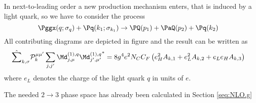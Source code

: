In next-to-leading order a new production mechanism enters, that is induced by a light quark, so we have to consider the process
\begin{equation}
\Pggx(q;\sigma_q) + \Pq(k_1;\sigma_{k_1}) \rightarrow \PQ(p_1)+\PaQ(p_2) + \Pq(k_2)
\end{equation}
All contributing diagrams are depicted in figure  and the result can be written as
\begin{equation}
\hat\sum_{k,\sigma}\mathcal P_{k}^{\mu\mu'}\sum_{j,j'}{\Md^{(1),q}_{j,\mu}\Md^{(1),q}_{j',\mu'}}^* = 8g^4e^2 N_C C_F\left( e_H^2 A_{k,1} +  e_L^2 A_{k,2} +  e_L e_H A_{k,3} \right)
\end{equation}
where $e_L$ denotes the charge of the light quark $q$ in units of $e$.

The needed $2\rightarrow 3$ phase space has already been calculated in Section \ref{seq:NLO.g}
